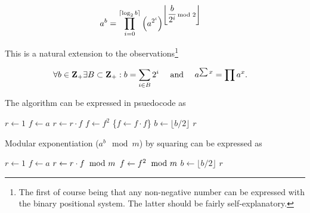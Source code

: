 \vspace{-1em}
\[ \hspace*{-0.4cm}
    a^b = \prod_{i = 0}^{\lceil \log_2 b \rceil}
    \left ( a^{2^i} \right )^{\left \lfloor {\displaystyle{b \over 2^i}} \hspace*{-1ex} \mod 2 \right \rfloor}
\]

\noindent
This is a natural extension to the
observations\footnote{The first of course being
that any non-negative number can be expressed
with the binary positional system. The latter
should be fairly self-explanatory.}

\vspace{-1em}
\[ \hspace*{-0.4cm}
    \forall b \in \textbf{Z}_{+} \exists B \subset \textbf{Z}_{+} : b = \sum_{i \in B} 2^i
    ~~~~ \textrm{and} ~~~~
    a^{\sum x} = \prod a^x.
\]

\noindent
The algorithm can be expressed in psuedocode as

\vspace{1em}
\hspace{-2.8ex}
\begin{minipage}{\linewidth}
\begin{algorithmic}
    \STATE $r \gets 1$
    \STATE $f \gets a$
        \STATE $r \gets r \cdot f$
      \ENDIF
      \STATE $f \gets f^2$ \qquad \textcolor{c}{\{$f \gets f \cdot f$\}}
      \STATE $b \gets \lfloor b / 2 \rfloor$
    \ENDWHILE
    \RETURN $r$ 
\end{algorithmic}
\end{minipage}
\vspace{1em}

\noindent
Modular exponentiation ($a^b \mod m$) by squaring can be
expressed as

\vspace{1em}
\hspace{-2.8ex}
\begin{minipage}{\linewidth}
\begin{algorithmic}
    \STATE $r \gets 1$
    \STATE $f \gets a$
        \STATE $r \gets r \cdot f \hspace*{-1ex}~ \mod m$
      \ENDIF
      \STATE $f \gets f^2 \hspace*{-1ex}~ \mod m$
      \STATE $b \gets \lfloor b / 2 \rfloor$
    \ENDWHILE
    \RETURN $r$ 
\end{algorithmic}
\end{minipage}
\vspace{1em}

